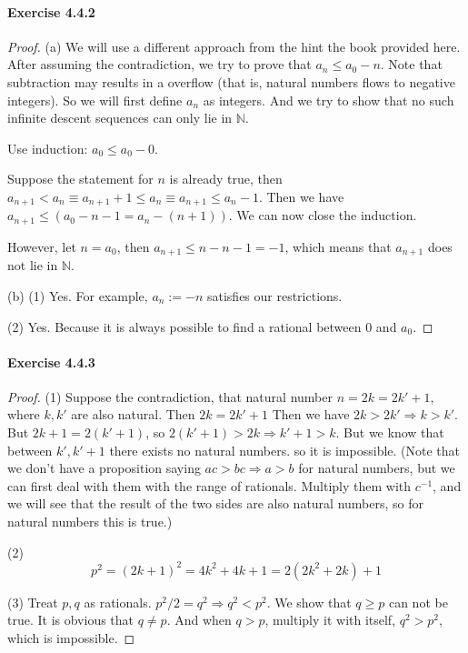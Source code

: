 \paragraph{Exercise 4.4.2} \label{exercise4.4.2}
\begin{proof}
(a) We will use a different approach from the hint the book provided here. After assuming the contradiction, we 
try to prove that 
$a_n \leq a_0 -n$. Note that subtraction may results in a overflow (that is, natural numbers flows to negative 
integers). So we will first define $a_n$ as integers. And we try to show that no such infinite descent 
sequences can only lie in  $\mathbb{N}$.

Use induction: $a_0 \leq a_0-0$.

Suppose the statement for $n$ is already true, then 
$a_{n+1} < a_n \equiv a_{n+1} +1 \leq a_n \equiv a_{n+1} \leq a_n - 1$. Then we have 
$a_{n+1} \leq (a_0 -n -1 = a_n -(n+1))$. We can now close the induction.

However, let $n = a_0$, then $a_{n+1} \leq n-n-1 = -1$, which means that $a_{n+1}$ does not lie in 
$\mathbb{N}$.

(b)
(1) Yes. For example, $a_n:=-n$ satisfies our restrictions.

(2) Yes. Because it is always possible to find a rational between $0$ and $a_0$.
\end{proof}

\paragraph{Exercise 4.4.3} \label{exercise4.4.3}
\begin{proof}
(1) Suppose the contradiction, that natural number $n=2k=2k'+1$, where $k,k'$ are also natural. Then $2k=2k'+1$
Then we have $2k > 2k' \Longrightarrow k>k'$. But $2k+1 = 2(k'+1)$, so $2(k'+1) > 2k \Longrightarrow k'+1 >k$. 
But we know that between $k',k'+1$ there exists no natural numbers. so it is impossible. (Note that we don't 
have a proposition saying $ac>bc \Longrightarrow a>b$ for natural numbers, but we can first deal with them with 
the range of rationals. Multiply them with $c^{-1}$, and we will see that the result of the two sides are also 
natural numbers, so for natural numbers this is true.)

(2)
\[
p^2 = (2k+1)^2 = 4k^2+4k + 1 = 2(2k^2+2k) +1
\]

(3)
Treat $p,q$ as rationals.
$p^2/2=q^2 \Longrightarrow q^2<p^2$. We show that $q \geq p$ can not be true. It is obvious that $q \neq p$. 
And when $q>p$, multiply it with itself, $q^2>p^2$, which is impossible.
\end{proof}